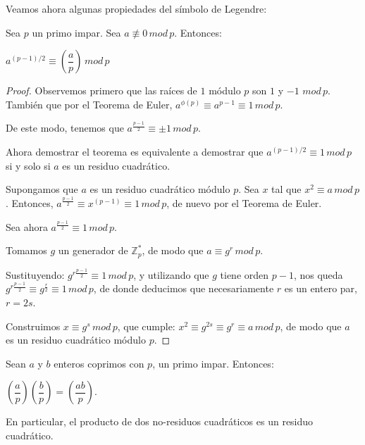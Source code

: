 \hfil

Veamos ahora algunas propiedades del símbolo de Legendre:

\begin{theorem}
	Sea $p$ un primo impar. Sea $a \not\equiv 0 \, mod \, p$. Entonces:
	
 	\begin{center}
 		$ a^{(p-1)/2} \equiv \left( \dfrac{a}{p} \right)  \, mod \, p$
 	\end{center}
	
\end{theorem}

\hfil

\begin{proof}
	Observemos primero que las raíces de $1$ módulo $p$ son $1$ y $-1$ $mod\, p$. También que por el Teorema de Euler, $a^{\phi(p)} \equiv a^{p-1} \equiv 1 \, mod \, p$.
	
	De este modo, tenemos que $ a^{\frac{p-1}{2}} \equiv \pm 1 \, mod \, p$.
	
	Ahora demostrar el teorema es equivalente a demostrar que $a^{(p-1)/2} \equiv 1 \, mod \, p$ si y solo si $a$ es un residuo cuadrático.
	
	\hfil
	
	Supongamos que $a$ es un residuo cuadrático módulo $p$. Sea $x$ tal que $x^2 \equiv a \, mod \, p$. Entonces, $ a^{\frac{p-1}{2}} \equiv x^{(p-1)} \equiv 1 \, mod \, p$, de nuevo por el Teorema de Euler.
	
	\hfil
	
	Sea ahora  $ a^{\frac{p-1}{2}} \equiv 1 \, mod \, p$.
	
	Tomamos $g$ un generador de $\mathbb{Z}^*_p$, de modo que $a \equiv g^r \, mod \, p$.
	
	Sustituyendo:
	 $ g^{r\frac{p-1}{2}} \equiv 1 \, mod \, p$, 
	 y utilizando que $g$ tiene orden $p-1$, nos queda $ g^{r\frac{p-1}{2}} \equiv g^{\frac{r}{2}} \equiv 1 \, mod \, p$, de donde deducimos que necesariamente $r$ es un entero par, $r = 2s$.
	 
	 Construimos $x \equiv g^s \, mod \, p$, que cumple:
	 $x^2 \equiv g^{2s} \equiv g^r \equiv a \, mod \, p$,
	 de modo que $a$ es un residuo cuadrático módulo $p$.
	
\end{proof}

\begin{proposition}
	Sean $a$ y $b$ enteros coprimos con $p$, un primo impar. Entonces:
	
\begin{center}
 	$
		\left( \dfrac{a}{p} \right) 	\left( \dfrac{b}{p} \right) = 	\left( \dfrac{ab}{p} \right) 
	$.
\end{center}
	
	En particular, el producto de dos no-residuos cuadráticos es un residuo cuadrático.
	
\end{proposition}

